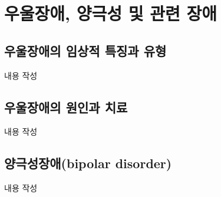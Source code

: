 \section{우울장애, 양극성 및 관련 장애}

\subsection{우울장애의 임상적 특징과 유형}
내용 작성

\subsection{우울장애의 원인과 치료}
내용 작성

\subsection{양극성장애(bipolar disorder)}
내용 작성
